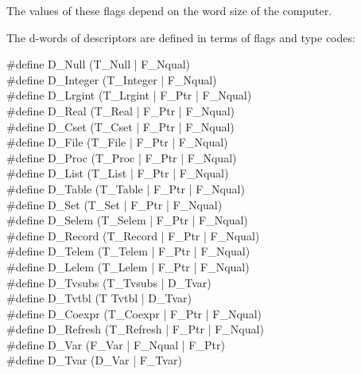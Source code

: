 The values of these flags depend on the word size of the computer.

The d-words of descriptors are defined in terms of flags and type codes:

\begin{iconcode}
\#define D\_Null	\>\>\>\>\>\>\>\>(T\_Null | F\_Nqual)\\                   
\#define D\_Integer \>\>\>\>\>\>\>\>(T\_Integer | F\_Nqual)\\            	 
\#define D\_Lrgint  \>\>\>\>\>\>\>\>(T\_Lrgint | F\_Ptr | F\_Nqual)\\     	 
\#define D\_Real    \>\>\>\>\>\>\>\>(T\_Real | F\_Ptr | F\_Nqual)\\          
\#define D\_Cset    \>\>\>\>\>\>\>\>(T\_Cset | F\_Ptr | F\_Nqual)\\          
\#define D\_File    \>\>\>\>\>\>\>\>(T\_File | F\_Ptr | F\_Nqual)\\          
\#define D\_Proc    \>\>\>\>\>\>\>\>(T\_Proc | F\_Ptr | F\_Nqual)\\          
\#define D\_List    \>\>\>\>\>\>\>\>(T\_List | F\_Ptr | F\_Nqual)\\          
\#define D\_Table   \>\>\>\>\>\>\>\>(T\_Table | F\_Ptr | F\_Nqual)\\       	 
\#define D\_Set     \>\>\>\>\>\>\>\>(T\_Set | F\_Ptr | F\_Nqual)\\           
\#define D\_Selem   \>\>\>\>\>\>\>\>(T\_Selem | F\_Ptr | F\_Nqual)\\       	 
\#define D\_Record  \>\>\>\>\>\>\>\>(T\_Record | F\_Ptr | F\_Nqual)\\     	 
\#define D\_Telem   \>\>\>\>\>\>\>\>(T\_Telem | F\_Ptr | F\_Nqual)\\       	 
\#define D\_Lelem   \>\>\>\>\>\>\>\>(T\_Lelem | F\_Ptr | F\_Nqual)\\       	 
\#define D\_Tvsubs  \>\>\>\>\>\>\>\>(T\_Tvsubs | D\_Tvar)\\               	 
\#define D\_Tvtbl   \>\>\>\>\>\>\>\>(T Tvtbl | D\_Tvar)\\                  	 
\#define D\_Coexpr  \>\>\>\>\>\>\>\>(T\_Coexpr | F\_Ptr | F\_Nqual)\\     	 
\#define D\_Refresh \>\>\>\>\>\>\>\>(T\_Refresh | F\_Ptr | F\_Nqual)\\   	 
\#define D\_Var     \>\>\>\>\>\>\>\>(F\_Var | F\_Nqual | F\_Ptr)\\   
\#define D\_Tvar    \>\>\>\>\>\>\>\>(D\_Var | F\_Tvar)
\end{iconcode}

